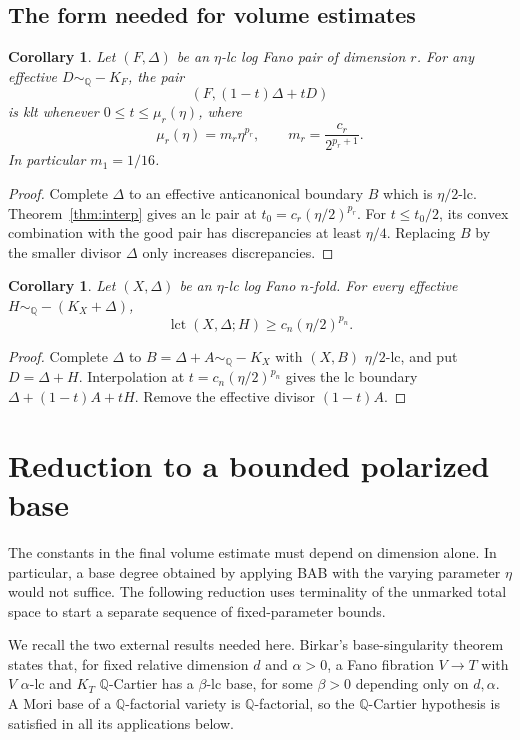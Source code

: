 \documentclass[11pt,reqno]{amsart}
\numberwithin{equation}{section}
\newtheorem{corollary}[theorem]{Corollary}
\theoremstyle{definition}
\theoremstyle{remark}
\newcommand{\Q}{\mathbb Q}
\newcommand{\simq}{\sim_{\Q}}
\newcommand{\lct}{\operatorname{lct}}
\begin{document}
\subsection{The form needed for volume estimates}
\begin{corollary}\label{cor:logfanointerp}
Let $(F,\Delta)$ be an $\eta$-lc log Fano pair of dimension $r$. For any effective $D\simq-K_F$, the pair
\[
 (F,(1-t)\Delta+tD)
\]
is klt whenever $0\le t\le\mu_r(\eta)$, where
\begin{equation}\label{eq:mr}
 \mu_r(\eta)=m_r\eta^{p_r},\qquad
 m_r=\frac{c_r}{2^{p_r+1}}.
\end{equation}
In particular $m_1=1/16$.
\end{corollary}
\begin{proof}
Complete $\Delta$ to an effective anticanonical boundary $B$ which is $\eta/2$-lc. Theorem~\ref{thm:interp} gives an lc pair at $t_0=c_r(\eta/2)^{p_r}$. For $t\le t_0/2$, its convex combination with the good pair has discrepancies at least $\eta/4$. Replacing $B$ by the smaller divisor $\Delta$ only increases discrepancies.
\end{proof}

\begin{corollary}\label{cor:alpha}
Let $(X,\Delta)$ be an $\eta$-lc log Fano $n$-fold. For every effective $H\simq-(K_X+\Delta)$,
\[
 \lct(X,\Delta;H)\ge c_n(\eta/2)^{p_n}.
\]
\end{corollary}
\begin{proof}
Complete $\Delta$ to $B=\Delta+A\simq-K_X$ with $(X,B)$ $\eta/2$-lc, and put $D=\Delta+H$. Interpolation at $t=c_n(\eta/2)^{p_n}$ gives the lc boundary $\Delta+(1-t)A+tH$. Remove the effective divisor $(1-t)A$.
\end{proof}

\section{Reduction to a bounded polarized base}\label{sec:base}

The constants in the final volume estimate must depend on dimension alone. In particular, a base degree obtained by applying BAB with the varying parameter $\eta$ would not suffice. The following reduction uses terminality of the unmarked total space to start a separate sequence of fixed-parameter bounds.

We recall the two external results needed here. Birkar's base-singularity theorem \cite[Corollary~1.2]{BirFib} states that, for fixed relative dimension $d$ and $\alpha>0$, a Fano fibration $V\to T$ with $V$ $\alpha$-lc and $K_T$ $\Q$-Cartier has a $\beta$-lc base, for some $\beta>0$ depending only on $d,\alpha$. A Mori base of a $\Q$-factorial variety is $\Q$-factorial, so the $\Q$-Cartier hypothesis is satisfied in all its applications below.
\end{document}
